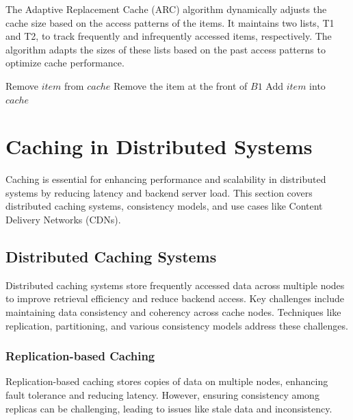 \documentclass[12pt]{book} %
\begin{document}
The Adaptive Replacement Cache (ARC) algorithm dynamically adjusts the cache size based on the access patterns of the items. It maintains two lists, T1 and T2, to track frequently and infrequently accessed items, respectively. The algorithm adapts the sizes of these lists based on the past access patterns to optimize cache performance.
\FloatBarrier
\begin{algorithm}
\caption{Adaptive Replacement Cache (ARC)}
\begin{algorithmic}[1]
            \State Remove $item$ from $cache$
        \Else
            \State Remove the item at the front of $B1$
        \EndIf
    \EndIf
    \State Add $item$ into $cache$
\EndFunction
\end{algorithmic}
\end{algorithm}


\section{Caching in Distributed Systems}

Caching is essential for enhancing performance and scalability in distributed systems by reducing latency and backend server load. This section covers distributed caching systems, consistency models, and use cases like Content Delivery Networks (CDNs).

\subsection{Distributed Caching Systems}

Distributed caching systems store frequently accessed data across multiple nodes to improve retrieval efficiency and reduce backend access. Key challenges include maintaining data consistency and coherency across cache nodes. Techniques like replication, partitioning, and various consistency models address these challenges.

\subsubsection{Replication-based Caching}

Replication-based caching stores copies of data on multiple nodes, enhancing fault tolerance and reducing latency. However, ensuring consistency among replicas can be challenging, leading to issues like stale data and inconsistency.
\end{document}
